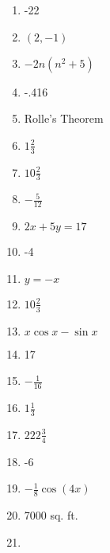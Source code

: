 \documentclass[../uilmath.tex]{subfiles}
\begin{document}
\begin{enumerate}[label=\bfseries\arabic*.]
    \item %
    -22

    \item %
    $(2,-1)$

    \item %
    $-2n(n^2+5)$

    \item %
    -.416

    \item %
    Rolle's Theorem 

    \item %
    $1\frac{2}{3}$

    \item %
    $10\frac{2}{3}$

    \item %
    $-\frac{5}{12}$

    \item %
    $2x+5y=17$

    \item %
    -4

    \item %
    $y=-x$

    \item %
    $10\frac{2}{3}$

    \item %
    $x\cos x-\sin x$

    \item %
    17 

    \item %
    $-\frac{1}{16}$

    \item %
    $1\frac{1}{3}$

    \item %
    $222\frac{3}{4}$

    \item %
    -6 

    \item %
    $-\frac{1}{8}\cos(4x)$

    \item %
    7000 sq. ft.

    \item %
    
\end{enumerate}
\end{document}
